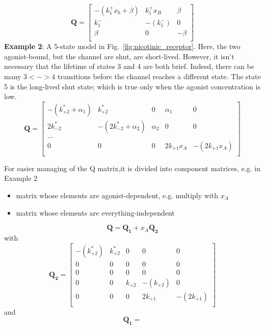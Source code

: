 \begin{equation}
  \label{eq:853}
  \mathbf{Q} = \left[
    \begin{array}{ccc}
      -(k_1^+x_b+\beta) & k_1^+x_B & \beta \\
      k_1^- & -(k_1^-) & 0 \\
      \beta & 0 & -\beta \\
    \end{array}
  \right]
\end{equation}
{\bf Example 2}: A 5-state model in
Fig.~\ref{fig:nicotinic_receptor}. Here, the two agonist-bound, but
the channel are shut, are short-lived. However, it isn't necessary
that the lifetime of states 3 and 4 are both brief. Indeed, there can
be many $3<->4$ transitions before the channel reaches a different
state. The state 5 is the long-lived shut state; which is true only
when the agonist concentration is low.
\begin{equation}
  \label{eq:855}
  \mathbf{Q} = \left[
    \begin{array}{ccccc}
      - (k^*_{+2}+\alpha_1) & k^*_{+2} & 0 & \alpha_1 & 0 \\
      2k^*_{-2} & - (2k^*_{-2}+\alpha_2) & \alpha_2 & 0 & 0 \\
      ... \\
      0 & 0 & 0 & 2k_{+1} x_A & -(2k_{+1} x_A) \\
    \end{array}
  \right]
\end{equation}

For easier managing of the Q matrix,it is divided into component
matrices, e.g. in Example 2
\begin{itemize}
\item matrix whose elements are agonist-dependent, e.g. multiply with
  $x_A$
\item matrix whose elements are everything-independent
\end{itemize}

\begin{equation}
  \label{eq:856}
  \mathbf{Q} = \mathbf{Q_1} + x_A \mathbf{Q_2}
\end{equation}
with
\begin{equation}
  \label{eq:857}
  \mathbf{Q_2} = \left[
    \begin{array}{ccccc}
      - (k^*_{+2}) & k^*_{+2} & 0 & 0 & 0 \\
      0 & 0 & 0 & 0 & 0 \\
      0 & 0 & 0 & 0 & 0 \\
      0 & 0 & k_{+2} & -(k_{+2}) & 0 \\
      0 & 0 & 0 & 2k_{+1} & -(2k_{+1}) \\
    \end{array}
  \right]
\end{equation}
and
\begin{equation}
  \label{eq:858}
  \mathbf{Q_1} =
\end{equation}

